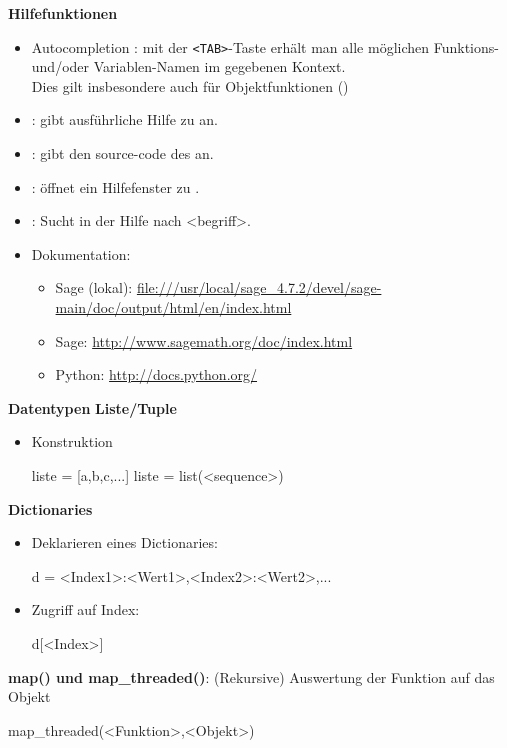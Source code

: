 \documentclass[a4paper,9pt,DIV15,twocolumn]{scrartcl}
\begin{document}
\textbf{Hilfefunktionen}
\begin{itemize}
\item {\color{blue} Autocompletion :} mit der {\color{blue} \verb~<TAB>~}-Taste erhält man alle möglichen Funktions- und/oder Variablen-Namen im gegebenen Kontext.\\
Dies gilt insbesondere auch für Objektfunktionen ()
\item {\color{blue}  :} gibt ausführliche Hilfe zu  an.
\item {\color{blue}  :} gibt den source-code des  an.
\item {\color{blue}  :} öffnet ein Hilfefenster zu .
\item {\color{blue}  :} Sucht in der Hilfe nach <begriff>.
\item Dokumentation:
\begin{itemize}
\item Sage (lokal): \url{file:///usr/local/sage_4.7.2/devel/sage-main/doc/output/html/en/index.html}
\item Sage: \url{http://www.sagemath.org/doc/index.html}
\item Python: \url{http://docs.python.org/}
\end{itemize}
\end{itemize}

\textbf{Datentypen}
\textbf{Liste/Tuple}
\begin{itemize}
 \item Konstruktion
\begin{sagein}
liste = [a,b,c,...] 
liste = list(<sequence>)
\end{sagein}
\end{itemize}
\bigskip
\bigskip
\bigskip
\bigskip
\textbf{Dictionaries}
\begin{itemize}
 \item Deklarieren eines Dictionaries:
\begin{sagein}
d = {<Index1>:<Wert1>,<Index2>:<Wert2>,...}
\end{sagein}
 \item Zugriff auf Index:
\begin{sagein}
d[<Index>]
\end{sagein}
\end{itemize}

\textbf{map() und map\_threaded()}:
(Rekursive) Auswertung der Funktion auf das Objekt
\begin{sagein}
 map_threaded(<Funktion>,<Objekt>)
\end{sagein}
\end{document}
